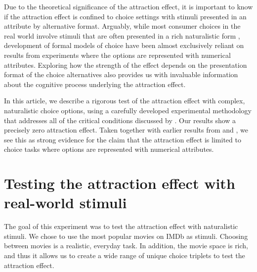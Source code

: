 \documentclass[12pt, a4paper]{article}
\begin{document}
Due to the theoretical significance of the attraction effect, it is important to know if the attraction effect is confined to choice settings with stimuli presented in an attribute by alternative format. Arguably, while most consumer choices in the real world involve stimuli that are often presented in a rich naturalistic form \cite{Bhatia2018b}, development of formal models of choice have been almost exclusively reliant on results from experiments where the options are represented with numerical attributes. Exploring how the strength of the effect depends on the presentation format of the choice alternatives also provides us with invaluable information about the cognitive process underlying the attraction effect. 


In this article, we describe a rigorous test of the attraction effect with complex, naturalistic choice options, using a carefully developed experimental methodology that addresses all of the critical conditions discussed by . Our results show a precisely zero attraction effect. Taken together with earlier results from  and , we see this as strong evidence for the claim that the attraction effect is limited to choice tasks where options are represented with numerical attributes.




\section*{Testing the attraction effect with real-world stimuli}

The goal of this experiment was to test the attraction effect with naturalistic stimuli. We chose to use the most popular movies on IMDb as stimuli. Choosing between movies is a realistic, everyday task. In addition, the movie space is rich, and thus it allows us to create a wide range of unique choice triplets to test the attraction effect.
\end{document}
